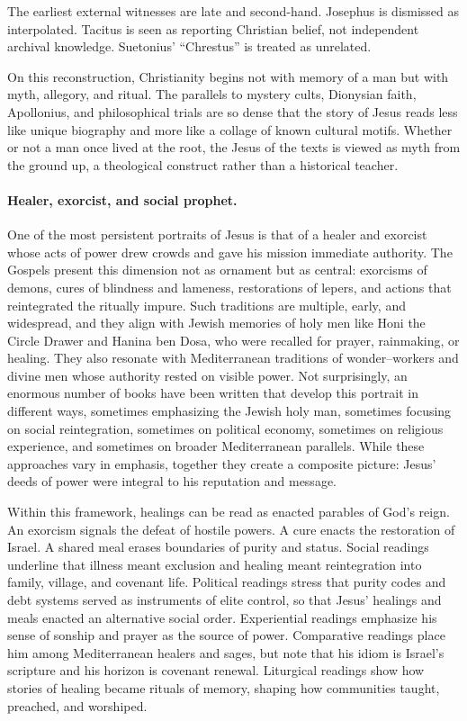 The earliest external witnesses are late and second-hand.
Josephus is dismissed as interpolated.
Tacitus is seen as reporting Christian belief, not independent archival knowledge.
Suetonius’ “Chrestus” is treated as unrelated.

On this reconstruction, Christianity begins not with memory of a man but with myth, allegory, and ritual.
The parallels to mystery cults, Dionysian faith, Apollonius, and philosophical trials are so dense that the story of Jesus reads less like unique biography and more like a collage of known cultural motifs.
Whether or not a man once lived at the root, the Jesus of the texts is viewed as myth from the ground up, a theological construct rather than a historical teacher.

\paragraph{Healer, exorcist, and social prophet.}

One of the most persistent portraits of Jesus is that of a healer and exorcist whose acts of power drew crowds and gave his mission immediate authority.
The Gospels present this dimension not as ornament but as central: exorcisms of demons, cures of blindness and lameness, restorations of lepers, and actions that reintegrated the ritually impure.
Such traditions are multiple, early, and widespread, and they align with Jewish memories of holy men like Honi the Circle Drawer and Hanina ben Dosa, who were recalled for prayer, rainmaking, or healing.
They also resonate with Mediterranean traditions of wonder–workers and divine men whose authority rested on visible power.
Not surprisingly, an enormous number of books have been written that develop this portrait in different ways, sometimes emphasizing the Jewish holy man, sometimes focusing on social reintegration, sometimes on political economy, sometimes on religious experience, and sometimes on broader Mediterranean parallels.
While these approaches vary in emphasis, together they create a composite picture: Jesus’ deeds of power were integral to his reputation and message.

Within this framework, healings can be read as enacted parables of God’s reign.
An exorcism signals the defeat of hostile powers.
A cure enacts the restoration of Israel.
A shared meal erases boundaries of purity and status.
Social readings underline that illness meant exclusion and healing meant reintegration into family, village, and covenant life.
Political readings stress that purity codes and debt systems served as instruments of elite control, so that Jesus’ healings and meals enacted an alternative social order.
Experiential readings emphasize his sense of sonship and prayer as the source of power.
Comparative readings place him among Mediterranean healers and sages, but note that his idiom is Israel’s scripture and his horizon is covenant renewal.
Liturgical readings show how stories of healing became rituals of memory, shaping how communities taught, preached, and worshiped.

